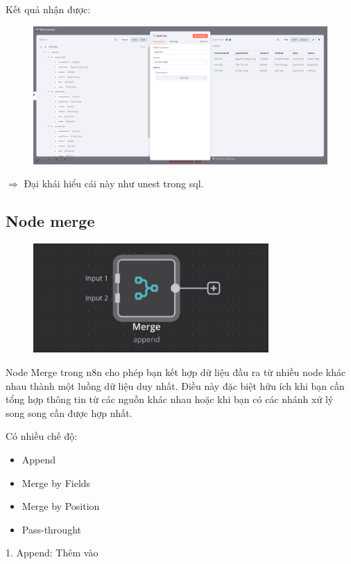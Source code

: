 \newpage

Kết quả nhận được:

\begin{figure}[htbp]
    \centering
    \includegraphics[width=1\linewidth]{Chap1-7/splitout.pdf}
\end{figure}

$\Rightarrow$ Đại khái hiểu cái này như unest trong sql.

\subsection{Node merge}
\begin{figure}[htbp]
    \centering
    \includegraphics[width=0.8\textwidth]{Chap1-7/merge-merge.pdf}
\end{figure}

Node Merge trong n8n cho phép bạn kết hợp dữ liệu đầu ra từ nhiều node khác nhau thành một luồng dữ liệu duy nhất. Điều này đặc biệt hữu ích khi bạn cần tổng hợp thông tin từ các nguồn khác nhau hoặc khi bạn có các nhánh xử lý song song cần được hợp nhất.

Có nhiều chế độ:

\begin{itemize}
    \item Append
    \item Merge by Fields
    \item Merge by Position
    \item Pass-throught
\end{itemize}
1. Append: Thêm vào

